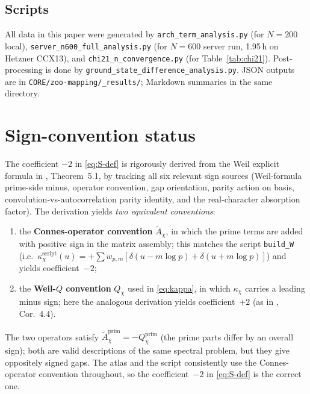 \documentclass[a4paper,10pt,twocolumn]{article}
\theoremstyle{definition}
\theoremstyle{remark}
\newcommand{\chifn}{\chi}
\begin{document}
\subsection{Scripts}
All data in this paper were generated by
\texttt{arch\_term\_analysis.py} (for $N=200$ local),
\texttt{server\_n600\_full\_analysis.py} (for $N=600$ server run,
1.95\,h on Hetzner CCX13), and
\texttt{chi21\_n\_convergence.py} (for Table~\ref{tab:chi21}).
Post-processing is done by \texttt{ground\_state\_difference\_analysis.py}.
JSON outputs are in \texttt{CORE/zoo-mapping/\_results/}; Markdown
summaries in the same directory.

\section{Sign-convention status}
\label{app:sign}

The coefficient $-2$ in \eqref{eq:S-def} is rigorously derived from
the Weil explicit formula in \cite{AnalyticKernelV2},
Theorem~5.1, by tracking all six relevant sign sources (Weil-formula
prime-side minus, operator convention, gap orientation, parity
action on basis, convolution-vs-autocorrelation parity identity,
and the real-character absorption factor). The derivation yields
\emph{two equivalent conventions}:
\begin{enumerate}
  \item the \textbf{Connes-operator convention} $\tilde A_{\chifn}$,
    in which the prime terms are added with positive sign in the
    matrix assembly; this matches the script
    \texttt{build\_W} (i.e.\ $\kappa^{\mathrm{script}}_{\chifn}(u)
    =+\sum w_{p,m}[\delta(u-m\log p)+\delta(u+m\log p)]$) and
    yields coefficient~$-2$;
  \item the \textbf{Weil-$Q$ convention} $Q_{\chifn}$ used in
    \eqref{eq:kappa}, in which $\kappa_{\chifn}$ carries a leading
    minus sign; here the analogous derivation yields
    coefficient~$+2$ (as in \cite{AnalyticKernel}, Cor.~4.4).
\end{enumerate}
The two operators satisfy
$\tilde A_{\chifn}^{\mathrm{prim}}=-Q_{\chifn}^{\mathrm{prim}}$ (the
prime parts differ by an overall sign); both are valid descriptions
of the same spectral problem, but they give oppositely signed gaps.
The atlas and the script consistently use the Connes-operator
convention throughout, so the coefficient~$-2$ in
\eqref{eq:S-def} is the correct one.
\end{document}
